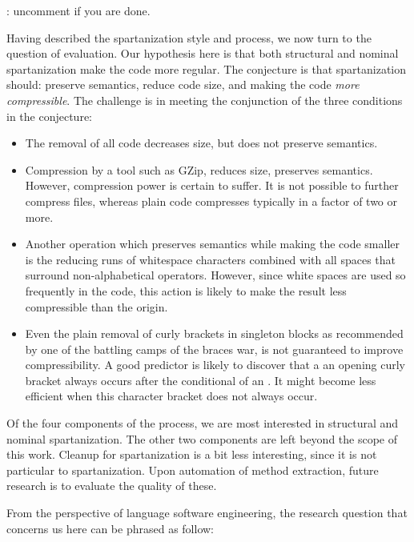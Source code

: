 \matteo: uncomment if you are done.

Having described the spartanization style and process, we now turn to the
question of evaluation.  Our hypothesis here is that both structural and
nominal spartanization make the code more regular. The conjecture is that
spartanization should: preserve semantics, reduce code size, and making the
code \emph{more compressible}. The challenge is in meeting the conjunction of
the three conditions in the conjecture:
\begin{itemize}
    \item The removal of all code decreases size, but does not preserve semantics.
    \item Compression by a tool such as GZip, reduces size, preserves
      semantics. However, compression power is certain to suffer. It is 
      not possible to further compress  files, whereas plain code
      compresses typically in a factor of two or more.
    \item Another operation which preserves semantics while making
      the code smaller is the reducing runs of whitespace characters combined 
      with all spaces that surround non-alphabetical operators. 
      However, since white spaces are used so frequently in the code,
      this action is likely to make the result less compressible than the origin. 
    \item Even the plain removal of curly brackets in singleton blocks as
      recommended by one of the battling camps of the braces war, is not guaranteed
      to improve compressibility. A good predictor is likely to discover that a
      an opening curly bracket always occurs after the conditional of an . 
      It might become less efficient when this character bracket does not always occur. 
\end{itemize}

Of the four components of the process, we are most interested in structural and
nominal spartanization. The other two components
are left beyond the scope of this work.  Cleanup for spartanization is a bit
less interesting, since it is not particular to spartanization.  Upon
automation of method extraction, future research is to evaluate the quality of
these. 

From the perspective of  language software engineering, the research question
that concerns us here can be phrased as follow: 

